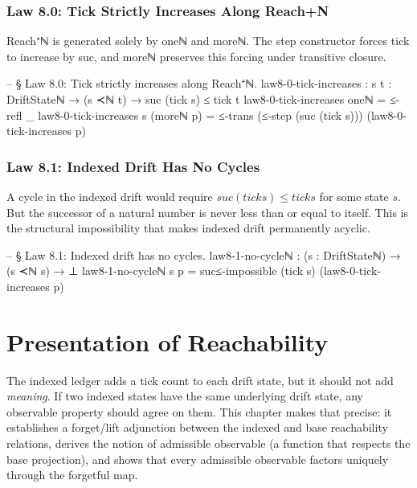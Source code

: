 \documentclass[11pt,a4paper]{book}
\def\mathbb#1{#1}%
\def\texttt#1{#1}%
\def\texorpdfstring#1#2{#2}%
\begin{document}
\subsection{Law 8.0: Tick Strictly Increases Along Reach\texorpdfstring{$^+_{\mathbb{N}}$}{+N}}

\texttt{Reach⁺ℕ} is generated solely by \texttt{oneℕ} and \texttt{moreℕ}. The step constructor forces \texttt{tick} to increase by \texttt{suc}, and \texttt{moreℕ} preserves this forcing under transitive closure.

\begin{code}
-- § Law 8.0: Tick strictly increases along Reach⁺ℕ.
law8-0-tick-increases : {s t : DriftStateℕ} → (s ≺ℕ t) → suc (tick s) ≤ tick t
law8-0-tick-increases oneℕ = ≤-refl _
law8-0-tick-increases {s} (moreℕ p) =
  ≤-trans (≤-step (suc (tick s))) (law8-0-tick-increases p)
\end{code}

\subsection{Law 8.1: Indexed Drift Has No Cycles}

A cycle in the indexed drift would require $\texttt{suc (tick s)} \le \texttt{tick s}$ for some state $s$. But the successor of a natural number is never less than or equal to itself. This is the structural impossibility that makes indexed drift permanently acyclic.

\begin{code}
-- § Law 8.1: Indexed drift has no cycles.
law8-1-no-cycleℕ : (s : DriftStateℕ) → (s ≺ℕ s) → ⊥
law8-1-no-cycleℕ s p = suc≤-impossible (tick s) (law8-0-tick-increases p)
\end{code}

\chapter{Presentation of Reachability}

The indexed ledger adds a tick count to each drift state, but it should not add \textit{meaning}. If two indexed states have the same underlying drift state, any observable property should agree on them. This chapter makes that precise: it establishes a forget/lift adjunction between the indexed and base reachability relations, derives the notion of admissible observable (a function that respects the base projection), and shows that every admissible observable factors uniquely through the forgetful map.
\end{document}
